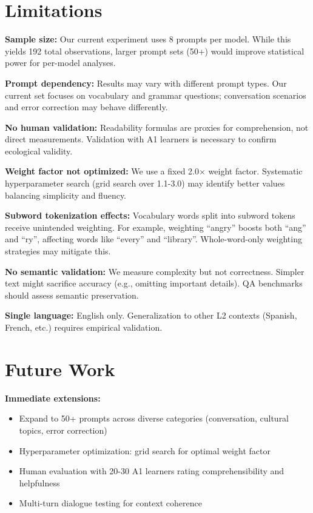\documentclass[10pt, a4paper]{article}
\begin{document}
\section{Limitations}

\textbf{Sample size:} Our current experiment uses 8 prompts per model. While this yields 192 total observations, larger prompt sets (50+) would improve statistical power for per-model analyses.

\textbf{Prompt dependency:} Results may vary with different prompt types. Our current set focuses on vocabulary and grammar questions; conversation scenarios and error correction may behave differently.

\textbf{No human validation:} Readability formulas are proxies for comprehension, not direct measurements. Validation with A1 learners is necessary to confirm ecological validity.

\textbf{Weight factor not optimized:} We use a fixed 2.0× weight factor. Systematic hyperparameter search (grid search over 1.1-3.0) may identify better values balancing simplicity and fluency.

\textbf{Subword tokenization effects:} Vocabulary words split into subword tokens receive unintended weighting. For example, weighting ``angry'' boosts both ``ang'' and ``ry'', affecting words like ``every'' and ``library''. Whole-word-only weighting strategies may mitigate this.

\textbf{No semantic validation:} We measure complexity but not correctness. Simpler text might sacrifice accuracy (e.g., omitting important details). QA benchmarks should assess semantic preservation.

\textbf{Single language:} English only. Generalization to other L2 contexts (Spanish, French, etc.) requires empirical validation.

\section{Future Work}

\textbf{Immediate extensions:}
\begin{itemize}
\item Expand to 50+ prompts across diverse categories (conversation, cultural topics, error correction)
\item Hyperparameter optimization: grid search for optimal weight factor
\item Human evaluation with 20-30 A1 learners rating comprehensibility and helpfulness
\item Multi-turn dialogue testing for context coherence
\end{itemize}
\end{document}

